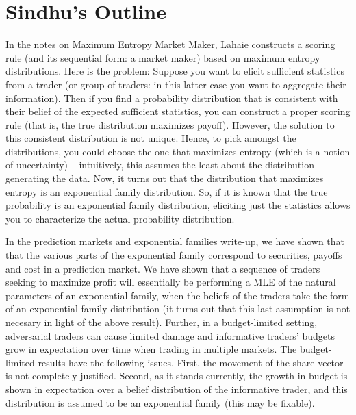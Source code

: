 
\section{Sindhu's Outline}

In the notes on Maximum Entropy Market Maker, Lahaie constructs a scoring rule (and its sequential form: a market maker) based on maximum entropy distributions. Here is the problem: Suppose you want to elicit sufficient statistics from a trader (or group of traders: in this latter case you want to aggregate their information). Then if you find a probability distribution that is consistent with their belief of the expected sufficient statistics, you can construct a proper scoring rule (that is, the true distribution maximizes payoff). However, the solution to this consistent distribution is not unique. Hence, to pick amongst the distributions, you could choose the one that maximizes entropy (which is a notion of uncertainty) -- intuitively, this assumes the least about the distribution generating the data. Now, it turns out that the distribution that maximizes entropy is an exponential family distribution. So, if it is known that the true probability is an exponential family distribution, eliciting just the statistics allows you to characterize the actual probability distribution.

In the prediction markets and exponential families write-up, we have shown that that the various parts of the exponential family correspond to securities, payoffs and cost in a prediction market. We have shown that a sequence of traders seeking to maximize profit will essentially be performing a MLE of the natural parameters of an exponential family, when the beliefs of the traders take the form of an exponential family distribution (it turns out that this last assumption is not necesary in light of the above result). Further, in a budget-limited setting, adversarial traders can cause limited damage and informative traders' budgets grow in expectation over time when trading in multiple markets. The budget-limited results have the following issues. First, the movement of the share vector is not completely justified. Second, as it stands currently, the growth in budget is shown in expectation over a belief distribution of the informative trader, and this distribution is assumed to be an exponential family (this may be fixable).


